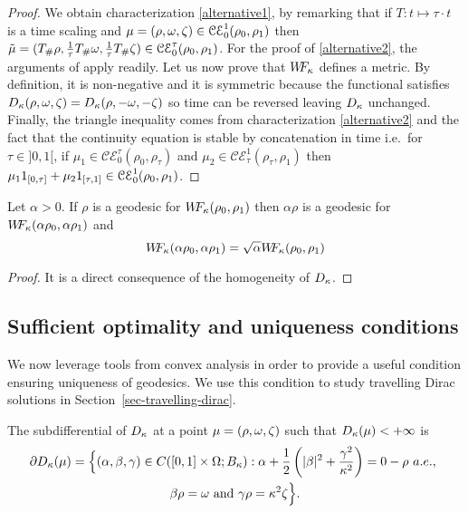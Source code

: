 \begin{proof}
We obtain characterization \eqref{alternative1}, by remarking that if $T:t \mapsto \tau \cdot t$ is a time scaling and $\mu=(\rho,\omega,\zeta) \in \mathcal{CE}_0^1(\rho_0,\rho_1)$ then $\tilde{\mu}=(T_{\#} \rho, \frac{1}{\tau}T_{\#} \omega, \frac{1}{\tau} T_{\#} \zeta) \in \mathcal{CE}_0^{\tau} (\rho_0, \rho_1)$. For the proof of \eqref{alternative2}, the arguments  of \cite[Theorem 5.4]{dolbeault2009new} apply readily. Let us now prove that $W\! \! F_{\kappa}$ defines a metric. By definition, it is non-negative and it is symmetric because the functional satisfies $D_{\kappa}(\rho,\omega,\zeta)=D_{\kappa}(\rho,-\omega,-\zeta)$ so time can be reversed leaving $D_{\kappa}$ unchanged. Finally, the triangle inequality comes from characterization \eqref{alternative2} and the fact that the continuity equation is stable by concatenation in time i.e.\ for $\tau \in ]0,1[$, if $\mu_1\in \mathcal{CE}_0^{\tau} (\rho_0, \rho_{\tau})$ and $\mu_2\in \mathcal{CE}_{\tau}^1 (\rho_{\tau}, \rho_1)$ then $\mu_1 1_{[0,\tau]}+\mu_2 1_{[\tau,1]} \in \mathcal{CE}_0^1(\rho_0,\rho_1)$. 
\end{proof}


\begin{proposition}
Let $\alpha >0$. If $\rho$ is a geodesic for $W\! \! F_{\kappa}(\rho_0,\rho_1)$ then $\alpha \rho$ is a geodesic for $W\! \! F_{\kappa}(\alpha \rho_0,\alpha \rho_1)$ and 
\[
W\! \! F_{\kappa}(\alpha \rho_0,\alpha \rho_1)=\sqrt{\alpha} W\! \! F_{\kappa}(\rho_0,\rho_1)
\]
\end{proposition}

\begin{proof}
It is a direct consequence of the homogeneity of $D_{\kappa}$.
\end{proof}

\subsection{Sufficient optimality and uniqueness conditions}
\label{sec:optimality condition}

We now leverage tools from convex analysis in order to provide a useful condition ensuring uniqueness of geodesics. We use this condition to study travelling Dirac solutions in Section~\ref{sec-travelling-dirac}. 

\begin{lemma}
The subdifferential of $D_{\kappa}$ at a point $\mu=(\rho,\omega,\zeta)$ such that $D_{\kappa} (\mu) < + \infty$ is
\begin{multline}
\label{subdiff}
\D \ifonc (\mu) = \Big\{ (\alpha,\beta,\gamma) \in C([0,1]\times \Om; B_{\kappa}) : 
 \alpha+\frac12 \left(  |\beta|^2 + \frac{\gamma^2}{\kappa^2}\right) = 0 - \rho \  a.e.,\  \\ 
  \beta \rho=\M \text{ and } \gamma \rho=\kappa^2 \Z \Big\}.
\end{multline}
\end{lemma}

